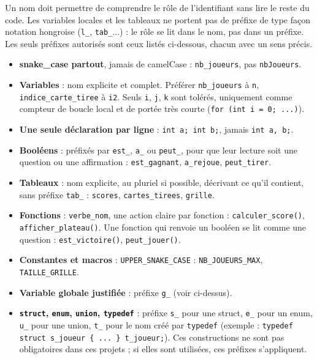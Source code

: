 Un nom doit permettre de comprendre le rôle de l'identifiant sans lire le
reste du code. Les variables locales et les tableaux ne portent pas de
préfixe de type façon notation hongroise (\texttt{l\_}, \texttt{tab\_}...) :
le rôle se lit dans le nom, pas dans un préfixe. Les seuls préfixes
autorisés sont ceux listés ci-dessous, chacun avec un sens précis.

\begin{itemize}
  \item \textbf{snake\_case partout}, jamais de camelCase : \texttt{nb\_joueurs}, pas \texttt{nbJoueurs}.
  \item \textbf{Variables} : nom explicite et complet. Préférer \texttt{nb\_joueurs} à \texttt{n}, \texttt{indice\_carte\_tiree} à \texttt{i2}. Seuls \texttt{i}, \texttt{j}, \texttt{k} sont tolérés, uniquement comme compteur de boucle local et de portée très courte (\texttt{for (int i = 0; ...)}).
  \item \textbf{Une seule déclaration par ligne} : \texttt{int a; int b;}, jamais \texttt{int a, b;}.
  \item \textbf{Booléens} : préfixés par \texttt{est\_}, \texttt{a\_} ou \texttt{peut\_}, pour que leur lecture soit une question ou une affirmation : \texttt{est\_gagnant}, \texttt{a\_rejoue}, \texttt{peut\_tirer}.
  \item \textbf{Tableaux} : nom explicite, au pluriel si possible, décrivant ce qu'il contient, sans préfixe \texttt{tab\_} : \texttt{scores}, \texttt{cartes\_tirees}, \texttt{grille}.
  \item \textbf{Fonctions} : \texttt{verbe\_nom}, une action claire par fonction : \texttt{calculer\_score()}, \texttt{afficher\_plateau()}. Une fonction qui renvoie un booléen se lit comme une question : \texttt{est\_victoire()}, \texttt{peut\_jouer()}.
  \item \textbf{Constantes et macros} : \texttt{UPPER\_SNAKE\_CASE} : \texttt{NB\_JOUEURS\_MAX}, \texttt{TAILLE\_GRILLE}.
  \item \textbf{Variable globale justifiée} : préfixe \texttt{g\_} (voir ci-dessus).
  \item \textbf{\texttt{struct}, \texttt{enum}, \texttt{union}, \texttt{typedef}} : préfixe \texttt{s\_} pour une struct, \texttt{e\_} pour un enum, \texttt{u\_} pour une union, \texttt{t\_} pour le nom créé par \texttt{typedef} (exemple : \texttt{typedef struct s\_joueur \{ ... \} t\_joueur;}). Ces constructions ne sont pas obligatoires dans ces projets ; si elles sont utilisées, ces préfixes s'appliquent.
\end{itemize}

